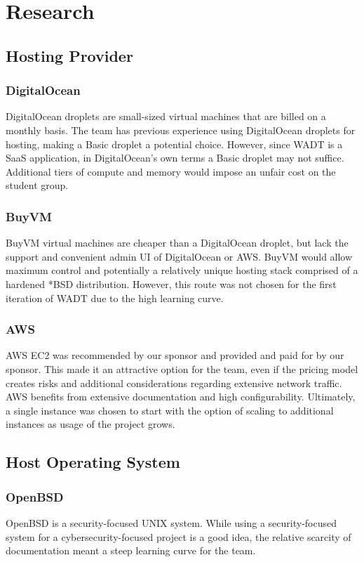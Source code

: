 \documentclass[12pt]{article}
\begin{document}
\section{Research}

\subsection{Hosting Provider}
\subsubsection{DigitalOcean}
DigitalOcean droplets are small-sized virtual machines that are billed on a monthly basis.
The team has previous experience using DigitalOcean droplets for hosting, making a Basic droplet a potential choice. However, since WADT is a SaaS application, in DigitalOcean's own terms a Basic droplet may not suffice. Additional tiers of compute and memory would impose an unfair cost on the student group.

\subsubsection{BuyVM}
BuyVM virtual machines are cheaper than a DigitalOcean droplet, but lack the support and convenient admin UI of DigitalOcean or AWS. BuyVM would allow maximum control and potentially a relatively unique hosting stack comprised of a hardened *BSD distribution. However, this route was not chosen for the first iteration of WADT due to the high learning curve.

\subsubsection{AWS}
AWS EC2 was recommended by our sponsor and provided and paid for by our sponsor. This made it an attractive option for the team, even if the pricing model creates risks and additional considerations regarding extensive network traffic. AWS benefits from extensive documentation and high configurability. Ultimately, a single instance was chosen to start with the option of scaling to additional instances as usage of the project grows.

\subsection{Host Operating System}
\subsubsection{OpenBSD}
OpenBSD is a security-focused UNIX system. While using a security-focused system for a cybersecurity-focused project is a good idea, the relative scarcity of documentation meant a steep learning curve for the team.
\end{document}

